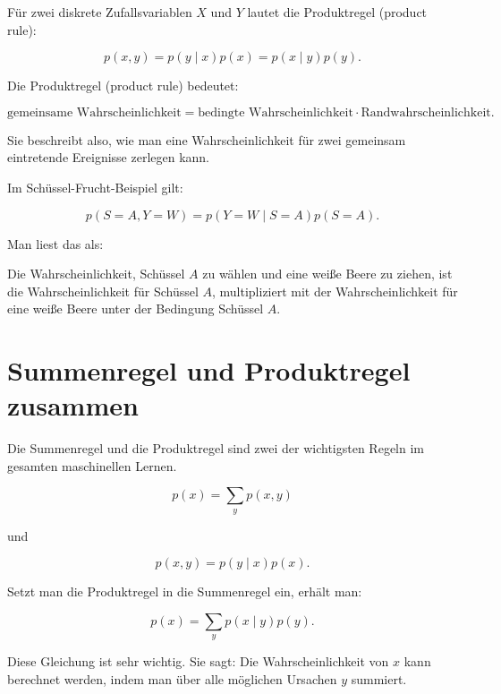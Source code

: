 \begin{definitionbox}
Für zwei diskrete Zufallsvariablen \(X\) und \(Y\) lautet die Produktregel (product rule):

\[
    p(x,y)
    =
    p(y \mid x)p(x)
    =
    p(x \mid y)p(y).
\]
\end{definitionbox}

\begin{conceptbox}
Die Produktregel (product rule) bedeutet:

\[
    \text{gemeinsame Wahrscheinlichkeit}
    =
    \text{bedingte Wahrscheinlichkeit}
    \cdot
    \text{Randwahrscheinlichkeit}.
\]

Sie beschreibt also, wie man eine Wahrscheinlichkeit für zwei gemeinsam eintretende Ereignisse zerlegen kann.
\end{conceptbox}

\begin{examplebox}
Im Schüssel-Frucht-Beispiel gilt:

\[
    p(S=A,Y=W)
    =
    p(Y=W \mid S=A)p(S=A).
\]

Man liest das als:

\begin{center}
Die Wahrscheinlichkeit, Schüssel \(A\) zu wählen und eine weiße Beere zu ziehen, ist die Wahrscheinlichkeit für Schüssel \(A\), multipliziert mit der Wahrscheinlichkeit für eine weiße Beere unter der Bedingung Schüssel \(A\).
\end{center}
\end{examplebox}

\section{Summenregel und Produktregel zusammen}

Die Summenregel und die Produktregel sind zwei der wichtigsten Regeln im gesamten maschinellen Lernen.

\[
    p(x)
    =
    \sum_y p(x,y)
\]

und

\[
    p(x,y)
    =
    p(y \mid x)p(x).
\]

Setzt man die Produktregel in die Summenregel ein, erhält man:

\[
    p(x)
    =
    \sum_y p(x \mid y)p(y).
\]

Diese Gleichung ist sehr wichtig.
Sie sagt:
Die Wahrscheinlichkeit von \(x\) kann berechnet werden, indem man über alle möglichen Ursachen \(y\) summiert.

